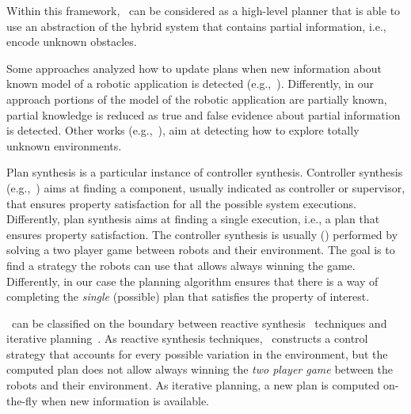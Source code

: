 \begin{enumerate*}
Within this framework, \toolName\ can be considered as a high-level planner that is able to use an abstraction of the hybrid system that contains partial information, i.e., encode unknown obstacles.
\item Some  approaches  analyzed how to update plans when new information about known model of a robotic application is detected (e.g.,~\cite{guo2015multi}). 
Differently, in our approach portions of the model of the robotic application are partially known,  partial knowledge is reduced as true and false evidence about partial information is detected.
Other works (e.g.,~\cite{7139310}), aim at detecting how to explore totally unknown environments.
\item 
Plan synthesis is a particular instance of controller synthesis. 
Controller  synthesis (e.g.,~\cite{cassandras2009introduction,D'ippolito:2013:SNE:2430536.2430543}) aims at finding a component, usually indicated as controller or supervisor, that ensures property satisfaction for all the possible system executions.
Differently, plan synthesis aims at finding a single execution, i.e., a plan that ensures property satisfaction.
The controller synthesis  is usually (\cite{kress2009temporal,wongpiromsarn2009receding,chen2012ltl,livingston2012backtracking,guo2013revising}) performed by solving a two player game between robots and their environment.
The goal is to find a strategy the robots can use that allows always winning the game.
Differently, in our case the planning algorithm ensures that there is a way of completing the \emph{single} (possible) plan that satisfies the property of interest. 
\item \toolName\ can be classified on the boundary between reactive synthesis~\cite{chen2012ltl,livingston2012backtracking,thomas2002automata} techniques and iterative planning~\cite{guo2013revising,maly2013iterative}. 
As reactive synthesis techniques, \toolName\ constructs a control strategy that accounts for every possible variation in the environment, but the computed plan does not allow always winning the  \emph{two player game} between the robots and their environment.
As  iterative planning, a new plan is computed on-the-fly when new information is available.
\end{enumerate*}
